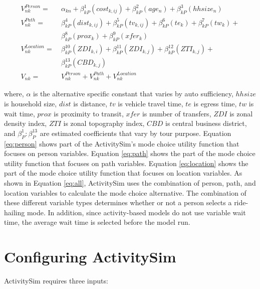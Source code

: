 \documentclass[fancy, masters]{byuthesis}
\begin{document}
\begin{align}
  V_{nk}^{Person} =& \ \alpha_{kn} + \beta_{kP}^1(cost_{k,ij}) + \beta_{kP}^2(age_{n}) 
   + \beta_{kP}^3(hhsize_{n}) \label{eq:person} \\
  V_{nk}^{Path} =& \ \beta_{kP}^4(dist_{k,ij}) +  \beta_{kP}^5(tv_{k,ij}) + 
       \beta_{kP}^6(te_{k}) +  \beta_{kP}^7(tw_{k}) + \nonumber \\ 
      & \ \beta_{kP}^8(prox_{k}) + \beta_{kP}^9(xfer_{k})  \label{eq:path} \\
  V_{nk}^{Location} =&  \ \beta_{kP}^{10}(ZDI_{k,i}) + \beta_{kP}^{11}(ZDI_{k,j}) + 
      \beta_{kP}^{12}(ZTI_{k,j}) + \nonumber \\ 
      & \ \beta_{kP}^{13}(CBD_{k,j}) \label{eq:location}\\
  V_{nk} =& \ V_{nk}^{Person} + V_{nk}^{Path} + V_{nk}^{Location} \label{eq:all}
\end{align}

where, \(\alpha\) is the alternative specific constant that varies by auto sufficiency, \(hhsize\) is household size, \(dist\) is distance, \(tv\) is vehicle travel time, \(te\) is egress time, \(tw\) is wait time, \(prox\) is proximity to transit, \(xfer\) is number of transfers, \(ZDI\) is zonal density index, \(ZTI\) is zonal topography index, \(CBD\) is central business district, and \(\beta_{P}^1:\beta_{P}^{13}\) are estimated coefficients that vary by tour purpose. Equation \eqref{eq:person} shows part of the ActivitySim's mode choice utility function that focuses on person variables. Equation \eqref{eq:path} shows the part of the mode choice utility function that focuses on path variables. Equation \eqref{eq:location} shows the part of the mode choice utility function that focuses on location variables. As shown in Equation \eqref{eq:all}, ActivitySim uses the combination of person, path, and location variables to calculate the mode choice alternative. The combination of these different variable types determines whether or not a person selects a ride-hailing mode. In addition, since activity-based models do not use variable wait time, the average wait time is selected before the model run.

\hypertarget{configuring-activitysim}{%
\section{Configuring ActivitySim}\label{configuring-activitysim}}

ActivitySim requires three inputs:
\end{document}
